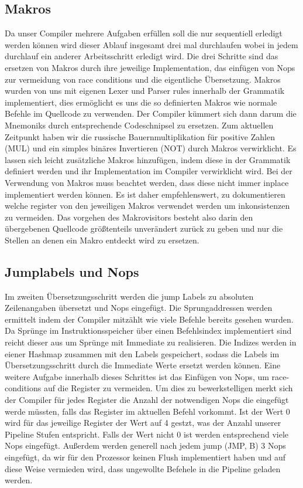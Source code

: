 \documentclass[paper=a4,fontsize=12pt]{scrreprt}
\begin{document}
\subsection{Makros}
Da unser Compiler mehrere Aufgaben erfüllen soll die nur sequentiell erledigt werden können wird dieser Ablauf insgesamt drei mal durchlaufen wobei in jedem durchlauf ein anderer Arbeitsschritt erledigt wird. Die drei Schritte sind das ersetzen von Makros durch ihre jeweilige Implementation, das einfügen von Nops zur vermeidung von race conditions und die eigentliche Übersetzung.
Makros wurden von uns mit eigenen Lexer und Parser rules innerhalb der Grammatik implementiert, dies ermöglicht es uns die so definierten Makros wie normale Befehle im Quellcode zu verwenden. Der Compiler kümmert sich dann darum die Mnemoniks durch entsprechende Codeschnipsel zu ersetzen. Zum aktuellen Zeitpunkt haben wir die russische Bauernmultiplikation für positive Zahlen (MUL) und ein simples binäres Invertieren (NOT) durch Makros verwirklicht. Es lassen sich leicht zusätzliche Makros hinzufügen, indem diese in der Grammatik definiert werden und ihr Implementation im Compiler verwirklicht wird. Bei der Verwendung von Makros muss beachtet werden, dass diese nicht immer inplace implementiert werden können. Es ist daher empfehlenswert, zu dokumentieren welche register von den jeweiligen Makros verwendet werden um inkonsistenzen zu vermeiden.
Das vorgehen des Makrovisitors besteht also darin den übergebenen Quellcode größtenteils unverändert zurück zu geben und nur die Stellen an denen ein Makro entdeckt wird zu ersetzen.

\subsection{Jumplabels und Nops}
Im zweiten Übersetzungsschritt werden die jump Labels zu absoluten Zeilenangaben übersetzt und Nops eingefügt. Die Sprungaddressen werden ermittelt indem der Compiler mitzählt wie viele Befehle bereits gesehen wurden. Da Sprünge im Instruktionsspeicher über einen Befehlsindex implementiert sind reicht dieser aus um Sprünge mit Immediate zu realisieren. Die Indizes werden in eiener Hashmap zusammen mit den Labels gespeichert, sodass die Labels im Übersetzungsschritt durch die Immediate Werte ersetzt werden können.
Eine weitere Aufgabe innerhalb dieses Schrittes ist das Einfügen von Nops, um race-conditions auf die Register zu vermeiden. Um dies zu bewerkstelligen merkt sich der Compiler für jedes Register die Anzahl der notwendigen Nops die eingefügt werde müssten, falls das Register im aktuellen Befehl vorkommt. Ist der Wert 0 wird für das jeweilige Register der Wert auf 4 gestzt, was der Anzahl unserer Pipeline Stufen entspricht. Falls der Wert nicht 0 ist werden entsprechend viele Nops eingefügt. Außerdem werden generell nach jedem jump (JMP, B) 3 Nops eingefügt, da wir für den Prozessor keinen Flush implementiert haben und auf diese Weise vermieden wird, dass ungewollte Befehele in die Pipeline geladen werden.
\end{document}
